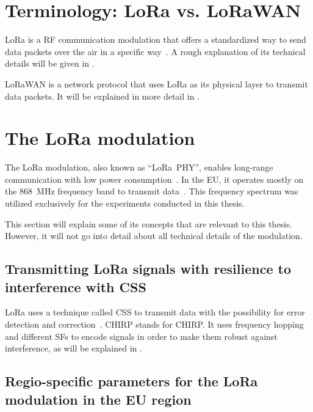 \section{Terminology: \acs{LoRa} vs. \acs{LoRaWAN}}

\acf{LoRa} is a \ac{RF} communication modulation that offers a standardized way to send data packets over the air in a specific way~\cite{semtech_corporation_lora_2023}.
A rough explanation of its technical details will be given in .

\ac{LoRaWAN} is a network protocol that uses \ac{LoRa} as its physical layer to transmit data packets.
It will be explained in more detail in .

\section{The \acs{LoRa} modulation}\label{sec:lora-modulation}

The \ac{LoRa} modulation, also known as ``\ac{LoRa}\ PHY'', enables long-range communication with low power consumption~\cite{chaudhari_understanding_2022}.
In the \ac{EU}, it operates mostly on the \SI{868}{\mega\hertz} frequency band to transmit data~\cite{lora_alliance_inc_lorawan_regional_2017}.
This frequency spectrum was utilized exclusively for the experiments conducted in this thesis.

This section will explain some of its concepts that are relevant to this thesis.
However, it will not go into detail about all technical details of the modulation.

\subsection{Transmitting \acs{LoRa} signals with resilience to interference with \acf{CSS}}\label{sec:chirp-spread-spectrum}

\ac{LoRa} uses a technique called \acl{CSS} to transmit data with the possibility for error detection and correction~\cite{reynders_chirp_2016}.
\acs{CHIRP} stands for \acl{CHIRP}.
It uses frequency hopping and different \aclp{SF} to encode signals in order to make them robust against interference, as will be explained in .

\subsection{Regio-specific parameters for the \acs{LoRa} modulation in the \acs{EU} region}\label{sec:duty-cycle}

